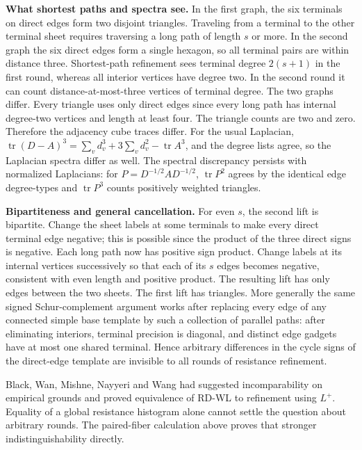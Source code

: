 \documentclass[10pt]{article}
\begin{document}
\textbf{What shortest paths and spectra see.} In the first graph, the six terminals on direct edges form two disjoint triangles. Traveling from a terminal to the other terminal sheet requires traversing a long path of length $s$ or more. In the second graph the six direct edges form a single hexagon, so all terminal pairs are within distance three. Shortest-path refinement sees terminal degree $2(s+1)$ in the first round, whereas all interior vertices have degree two. In the second round it can count distance-at-most-three vertices of terminal degree. The two graphs differ. Every triangle uses only direct edges since every long path has internal degree-two vertices and length at least four. The triangle counts are two and zero. Therefore the adjacency cube traces differ. For the usual Laplacian, $\operatorname{tr}(D-A)^3=\sum_v d_v^3+3\sum_v d_v^2-\operatorname{tr}A^3$, and the degree lists agree, so the Laplacian spectra differ as well. The spectral discrepancy persists with normalized Laplacians: for $P=D^{-1/2}AD^{-1/2}$, $\operatorname{tr}P^2$ agrees by the identical edge degree-types and $\operatorname{tr}P^3$ counts positively weighted triangles.

\textbf{Bipartiteness and general cancellation.} For even $s$, the second lift is bipartite. Change the sheet labels at some terminals to make every direct terminal edge negative; this is possible since the product of the three direct signs is negative. Each long path now has positive sign product. Change labels at its internal vertices successively so that each of its $s$ edges becomes negative, consistent with even length and positive product. The resulting lift has only edges between the two sheets. The first lift has triangles. More generally the same signed Schur-complement argument works after replacing every edge of any connected simple base template by such a collection of parallel paths: after eliminating interiors, terminal precision is diagonal, and distinct edge gadgets have at most one shared terminal. Hence arbitrary differences in the cycle signs of the direct-edge template are invisible to all rounds of resistance refinement.

Black, Wan, Mishne, Nayyeri and Wang had suggested incomparability on empirical grounds and proved equivalence of RD-WL to refinement using $L^+$. Equality of a global resistance histogram alone cannot settle the question about arbitrary rounds. The paired-fiber calculation above proves that stronger indistinguishability directly.
\end{document}
